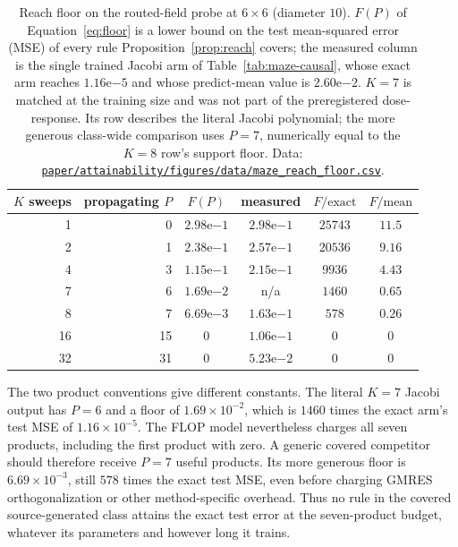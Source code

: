 \begin{table}[htbp]
  \centering
  \caption{Reach floor on the routed-field probe at $6\times6$ (diameter $10$).
  $F(P)$ of Equation~\eqref{eq:floor} is a lower bound on the test mean-squared
  error (MSE) of every rule Proposition~\ref{prop:reach} covers; the measured
  column is the single trained Jacobi arm of Table~\ref{tab:maze-causal}, whose
  exact arm reaches $1.16\mathrm{e}{-5}$ and whose predict-mean value is
  $2.60\mathrm{e}{-2}$. $K=7$ is matched at the training size and was not part
  of the preregistered dose-response. Its row describes the literal Jacobi
  polynomial; the more generous class-wide comparison uses $P=7$, numerically
  equal to the $K=8$ row's support floor. Data:
  \href{https://github.com/vanshsehrawat14/gabp-sparse-inv/blob/main/paper/attainability/figures/data/maze_reach_floor.csv}
{\nolinkurl{paper/attainability/figures/data/maze_reach_floor.csv}}.}
  \label{tab:reach-floor}
  \begin{tabular}{rrcccc}
    \toprule
    $K$ sweeps & propagating $P$ & $F(P)$ & measured & $F/\text{exact}$ & $F/\text{mean}$ \\
    \midrule
    1  & 0  & $2.98\mathrm{e}{-1}$ & $2.98\mathrm{e}{-1}$ & $25743$ & $11.5$ \\
    2  & 1  & $2.38\mathrm{e}{-1}$ & $2.57\mathrm{e}{-1}$ & $20536$ & $9.16$ \\
    4  & 3  & $1.15\mathrm{e}{-1}$ & $2.15\mathrm{e}{-1}$ & $9936$  & $4.43$ \\
    7  & 6  & $1.69\mathrm{e}{-2}$ & n/a                  & $1460$  & $0.65$ \\
    8  & 7  & $6.69\mathrm{e}{-3}$ & $1.63\mathrm{e}{-1}$ & $578$   & $0.26$ \\
    16 & 15 & $0$                  & $1.06\mathrm{e}{-1}$ & $0$     & $0$ \\
    32 & 31 & $0$                  & $5.23\mathrm{e}{-2}$ & $0$     & $0$ \\
    \bottomrule
  \end{tabular}
\end{table}

The two product conventions give different constants. The literal $K=7$
Jacobi output has $P=6$ and a floor of $1.69\times10^{-2}$, which is $1460$
times the exact arm's test MSE of
$1.16\times10^{-5}$. The FLOP model nevertheless charges all seven products,
including the first product with zero. A generic covered competitor should
therefore receive $P=7$ useful products. Its more generous floor is
$6.69\times10^{-3}$, still $578$ times the exact test MSE, even before charging
GMRES orthogonalization or other method-specific overhead. Thus no rule in the
covered source-generated class attains the exact test error at the
seven-product budget, whatever its parameters and however long it trains.

